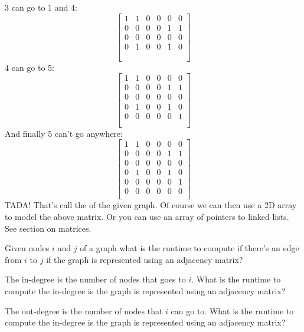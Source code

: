 3 can go to 1 and 4:
\[
\begin{bmatrix}
  1 & 1 & 0 & 0 & 0 & 0 \\
  0 & 0 & 0 & 0 & 1 & 1 \\
  0 & 0 & 0 & 0 & 0 & 0 \\
  0 & 1 & 0 & 0 & 1 & 0 \\
    & & & & & \\
    & & & & & \\
\end{bmatrix} 
\]
4 can go to 5:
\[
\begin{bmatrix}
  1 & 1 & 0 & 0 & 0 & 0 \\
  0 & 0 & 0 & 0 & 1 & 1 \\
  0 & 0 & 0 & 0 & 0 & 0 \\
  0 & 1 & 0 & 0 & 1 & 0 \\
  0 & 0 & 0 & 0 & 0 & 1 \\
    & & & & & \\
\end{bmatrix} 
\]
And finally 5 can't go anywhere:
\[
\begin{bmatrix}
  1 & 1 & 0 & 0 & 0 & 0 \\
  0 & 0 & 0 & 0 & 1 & 1 \\
  0 & 0 & 0 & 0 & 0 & 0 \\
  0 & 1 & 0 & 0 & 1 & 0 \\
  0 & 0 & 0 & 0 & 0 & 1 \\
  0 & 0 & 0 & 0 & 0 & 0 \\
\end{bmatrix} 
\]
TADA!
That's call the  of the given graph.
Of course we can then use a 2D array to model
the above matrix.
Or you can use an array of pointers to linked lists.
See section on matrices.

\begin{ex}
\begin{myenum}
  \item Given nodes $i$ and $j$ of a graph what is the runtime to
  compute if there's an edge from $i$ to $j$ if the graph
  is represented using an adjacency matrix?
  \item The in-degree is the number of nodes that goes to $i$.
  What is the runtime to compute the in-degree is the
  graph is represented using an adjacency matrix?
  \item The out-degree is the number of nodes that $i$ can go to.
  What is the runtime to compute the in-degree is the
  graph is represented using an adjacency matrix?
\end{myenum}
\end{ex}
  
